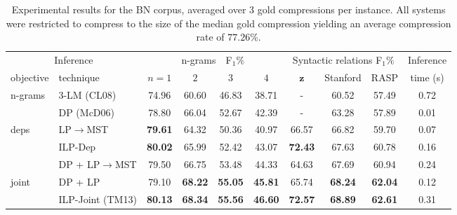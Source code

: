 \documentclass[11pt,a4paper]{article}
\begin{document}
\begin{table*}[t]
    \setlength{\tabcolsep}{4pt}
    \setlength{\belowcaptionskip}{-3pt}
\centering
\begin{tabular}{|p{40pt}l|cccc|ccc|c|}
        \hline
        \multicolumn{2}{|c|}{Inference}  & \multicolumn{4}{c|}{n-grams\ \ F$_1\%$} & \multicolumn{3}{c|}{Syntactic relations F$_1$\%} & Inference \\
        objective & \quad technique & $n=1$ & $2$ & $3$ & $4$ & $\mathbf{z}$ & Stanford & RASP & time (s) \\
        \hline
        \hline
        \multirow{2}{*}{n-grams} & 3-LM (CL08) & 74.96 & 60.60 & 46.83 & 38.71 & - & 60.52 & 57.49 & 0.72 \\
        & DP (McD06) & 78.80 & 66.04 & 52.67 & 42.39 & - & 63.28 & 57.89 & 0.01  \\
        \hline
        \multirow{2}{*}{deps} & LP$\rightarrow$MST   & {\bf 79.61} & 64.32 & 50.36 & 40.97 & 66.57 & 66.82 & 59.70 & 0.07 \\
        & ILP-Dep   & {\bf 80.02} & 65.99 & 52.42 & 43.07 & {\bf 72.43} & 67.63 & 60.78 & 0.16  \\
        \hline
        & DP + LP$\rightarrow$MST   & 79.50 & 66.75 & 53.48 & 44.33 & 64.63 & 67.69 & 60.94 & 0.24 \\
        joint & DP + LP & 79.10 & {\bf 68.22} & {\bf 55.05} & {\bf 45.81} & 65.74 & {\bf 68.24} & {\bf 62.04} & 0.12 \\
        & ILP-Joint (TM13)  & {\bf 80.13} & {\bf 68.34} & {\bf 55.56} & {\bf 46.60} & {\bf 72.57} & {\bf 68.89} & {\bf 62.61} & 0.31  \\
        \hline
\end{tabular}
\caption{Experimental results for the BN corpus, averaged over 3
    gold compressions per instance.
    All systems were restricted to compress to the size of the
    median gold compression yielding an average compression rate of $77.26\%$.}
\label{tab:bn}
\end{table*}
\end{document}
